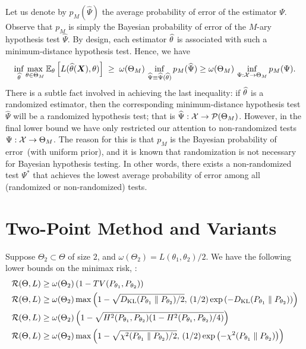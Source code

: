 \documentclass[12pt]{article}
\begin{document}
Let us denote by $p_M(\widehat{\Psi})$ the average probability of error of the estimator $\Psi$. Observe that $p_M$ is simply the Bayesian probability of error of the $M$-ary hypothesis test $\widehat{\Psi}$. By design, each estimator $\widehat{\theta}$  is associated with such a minimum-distance hypothesis test. Hence, we have 
\begin{align}
\inf_{\widehat{\theta}} \max_{\theta \in \Theta_M} \mathbb{E}_\theta \left[ L(\widehat{\theta}({\boldsymbol X}), \theta) \right] \; \geq \; \omega(\Theta_M)\, \inf_{\widehat{\Psi} \equiv \widehat{\Psi}(\widehat{\theta})} p_M(\widehat{\Psi}) \geq \omega(\Theta_M)\, \inf_{\Psi:{\cal X} \to \Theta_M} p_M(\Psi). 
\end{align}
There is a subtle fact involved in achieving the last inequality: if $\widehat{\theta}$ is a randomized estimator, then the corresponding minimum-distance hypothesis test $\widehat{\Psi}$ will be a randomized hypothesis test; that is $\widehat{\Psi}: {\cal X} \to {\cal P}(\Theta_M)$. However, in the final lower bound we have only restricted our attention to non-randomized tests $\Psi:{\cal X} \to \Theta_M$. The reason for this is that $p_M$ is the Bayesian probability of error~(with uniform prior), and it is known that randomization is not necessary for Bayesian hypothesis testing. In other words, there exists a non-randomized test $\Psi^*$ that achieves the lowest average probability of error among all (randomized or non-randomized) tests. 
\hfill\qedsymbol

\section{Two-Point Method and Variants}
\label{sec:two-point-method}

\begin{theorem}
	\label{theorem:Le-Cams-method} Suppose $\Theta_2 \subset \Theta$ of size $2$, and $\omega(\Theta_2) = L(\theta_1, \theta_2)/2$. We have the following lower bounds on the minimax risk, : 
	\begin{align}
	{\cal R}(\Theta, L) & \geq {\omega(\Theta_2)} \left( 1 - TV(P_{\theta_1}, P_{\theta_2})\right) \label{eq:le-cam-tv}  \\
	{\cal R}(\Theta, L) & \geq {\omega(\Theta_2)} \max \left( 1 - \sqrt{ D_{\text{KL}}(P_{\theta_1} \parallel P_{\theta_2})/2}, \, (1/2)\exp \left( - D_{\text{KL}} (P_{\theta_1} \parallel P_{\theta_2})\right)  \right) \label{eq:le-cam-kl} \\
	{\cal R}(\Theta, L) & \geq {\omega(\Theta_2)} \left( 1 - \sqrt{H^2(P_{\theta_1}, P_{\theta_2})(1-H^2(P_{\theta_1}, P_{\theta_2})/4)}\right) \label{eq:le-cam-hellinger}  \\
	{\cal R}(\Theta, L) & \geq {\omega(\Theta_2)} \max \left( 1 - \sqrt{ \chi^2(P_{\theta_1} \parallel P_{\theta_2})/2}, \, (1/2)\exp \left( - \chi^2 (P_{\theta_1} \parallel P_{\theta_2})\right)  \right) \label{eq:le-cam-chi-squared}
	\end{align}
\end{theorem}
\end{document}
